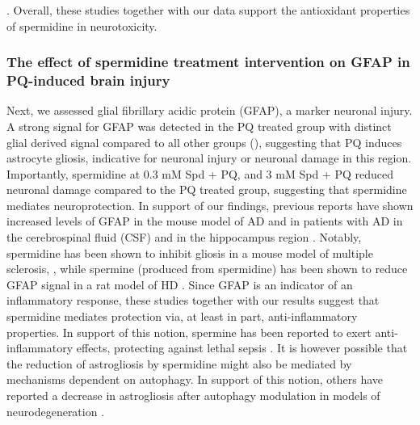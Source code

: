 \citep{Jamwal2016}. Overall, these studies together with our data support the antioxidant properties of spermidine in neurotoxicity.

\subsubsection{The effect of spermidine treatment intervention on GFAP in PQ-induced brain injury}
Next, we assessed glial fibrillary acidic protein (GFAP), a marker neuronal injury. A strong signal for GFAP was detected in the PQ treated group with distinct glial derived signal compared to all other groups (), suggesting that PQ induces astrocyte gliosis, indicative for neuronal injury or neuronal damage in this region. Importantly, spermidine at 0.3 mM Spd + PQ, and 3 mM Spd + PQ reduced neuronal damage compared to the PQ treated group, suggesting that spermidine mediates neuroprotection. In support of our findings, previous reports have shown increased levels of GFAP in the mouse model of AD \citep{Kamphuis2014,Kamphuis2012} and in patients with AD in the cerebrospinal fluid (CSF) \citep{Colangelo2014,Fukuyama2001,Ishiki2016} and in the hippocampus region \citep{Kamphuis2014}. Notably, spermidine has been shown to inhibit gliosis in a mouse model of multiple sclerosis, \citep{Guo2011}, while spermine (produced from spermidine) has been shown to reduce GFAP signal in a rat model of HD \citep{Velloso2009}. Since GFAP is an indicator of an inflammatory response, these studies together with our results suggest that spermidine mediates protection via, at least in part, anti-inflammatory properties. In support of this notion, spermine has been reported to exert anti-inflammatory effects, protecting against lethal sepsis \citep{Zhu2009}. It is however possible that the reduction of astrogliosis by spermidine might also be mediated by mechanisms dependent on autophagy. In support of this notion, others have reported a decrease in astrogliosis after autophagy modulation in models of neurodegeneration \citep{Castillo2013,Rodriguez-Navarro2010,Wang2012}. 

